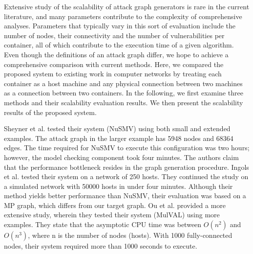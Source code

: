 Extensive study of the scalability of attack graph generators is rare in the current literature, and many parameters contribute to the complexity of comprehensive analyses. Parameters that typically vary in this sort of evaluation include the number of nodes, their connectivity and the number of vulnerabilities per container, all of which contribute to the execution time of a given algorithm. Even though the definitions of an attack graph differ, we hope to achieve a comprehensive comparison with current methods. Here, we compared the proposed system to existing work in computer networks by treating each container as a host machine and any physical connection between two machines as a connection between two containers. In the following, we first examine three methods and their scalability evaluation results. We then present the scalability results of the proposed system.

Sheyner et al. \cite{sheyner2002automated} tested their system (NuSMV) using both small and extended examples. The attack graph in the larger example has 5948 nodes and 68364 edges. The time required for NuSMV to execute this configuration was two hours; however, the model checking component took four minutes. The authors claim that the performance bottleneck resides in the graph generation procedure. Ingols et al. \cite{ingols2006practical} tested their system on a network of 250 hosts. They continued the study on a simulated network with 50000 hosts in under four minutes. Although their method yields better performance than NuSMV, their evaluation was based on a MP graph, which differs from our target graph. Ou et al. \cite{ou2006scalable} provided a more extensive study, wherein they tested their system (MulVAL) using more examples. They state that the asymptotic CPU time was between $O(n^2)$ and $O(n^3)$, where n is the number of nodes (hosts). With 1000 fully-connected nodes, their system required more than 1000 seconds to execute. %


